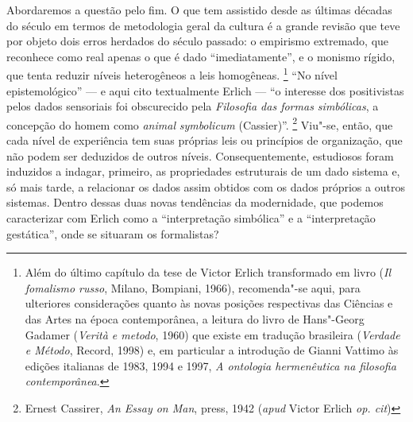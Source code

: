 Abordaremos a questão pelo fim. O que tem assistido desde as últimas
décadas do século  em termos de metodologia geral da cultura é a
grande revisão que teve por objeto dois erros herdados do século
passado: o empirismo extremado, que reconhece como real apenas o que é
dado ``imediatamente'', e o monismo rígido, que tenta reduzir níveis
heterogêneos a leis homogêneas. \footnote{Além do último capítulo da
  tese de Victor Erlich transformado em livro (\emph{Il fomalismo
  russo}, Milano, Bompiani, 1966), recomenda"-se aqui, para ulteriores
  considerações quanto às novas posições respectivas das Ciências e das
  Artes na época contemporânea, a leitura do livro de Hans"-Georg Gadamer
  (\emph{Verità e metodo}, 1960) que existe em tradução brasileira
  (\emph{Verdade e Método}, Record, 1998) e, em particular a introdução
  de Gianni Vattimo às edições italianas de 1983, 1994 e 1997, \emph{A
  ontologia hermenêutica na filosofia contemporânea}.} ``No nível
epistemológico'' --- e aqui cito textualmente Erlich --- ``o interesse dos
positivistas pelos dados sensoriais foi obscurecido pela \emph{Filosofia
das formas simbólicas}, a concepção do homem como \emph{animal}
\emph{symbolicum} (Cassier)''. \footnote{Ernest Cassirer, \emph{An Essay
  on Man}, press, 1942 (\emph{apud} Victor Erlich \emph{op. cit})}
Viu"-se, então, que cada nível de experiência tem suas próprias leis ou
princípios de organização, que não podem ser deduzidos de outros níveis.
Consequentemente, estudiosos foram induzidos a indagar, primeiro, as
propriedades estruturais de um dado sistema e, só mais tarde, a
relacionar os dados assim obtidos com os dados próprios a outros
sistemas. Dentro dessas duas novas tendências da modernidade, que
podemos caracterizar com Erlich como a ``interpretação simbólica'' e a
``interpretação gestática'', onde se situaram os formalistas?


